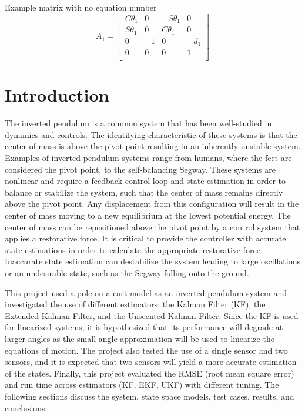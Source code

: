 \documentclass{article}
\begin{document}
Example matrix with no equation number
\[
A_{1} = 
\begin{bmatrix}
	C\theta_{1} & 0 & -S\theta_{1} & 0 \\
	S\theta_{1} & 0 & C\theta_{1} & 0  \\
	0 & -1 & 0 & -d_{1} \\
	0 & 0 & 0 & 1 \\ 
\end{bmatrix}
\]

\section{Introduction}

 The inverted pendulum is a common system that has been well-studied in dynamics and controls.  The identifying characteristic of these systems is that the center of mass is above the pivot point resulting in an inherently unstable system.  Examples of inverted pendulum systems range from humans, where the feet are considered the pivot point, to the self-balancing Segway.  These systems are nonlinear and require a feedback control loop and state estimation in order to balance or stabilize the system, such that the center of mass remains directly above the pivot point.  Any displacement from this configuration will result in the center of mass moving to a new equilibrium at the lowest potential energy.  The center of mass can be repositioned above the pivot point by a control system that applies a restorative force.  It is critical to provide the controller with accurate state estimations in order to calculate the appropriate restorative force.  Inaccurate state estimation can destabilize the system leading to large oscillations or an undesirable state, such as the Segway falling onto the ground.

 This project used a pole on a cart model as an inverted pendulum system and investigated the use of different estimators: the Kalman Filter (KF), the Extended Kalman Filter, and the Unscented Kalman Filter.  Since the KF is used for linearized systems, it is hypothesized that its performance will degrade at larger angles as the small angle approximation will be used to linearize the equations of motion.  The project also tested the use of a single sensor and two sensors, and it is expected that two sensors will yield a more accurate estimation of the states.  Finally, this project evaluated the RMSE (root mean square error) and run time across estimators (KF, EKF, UKF) with different tuning.  The following sections discuss the system, state space models, test cases, results, and conclusions.
\end{document}
